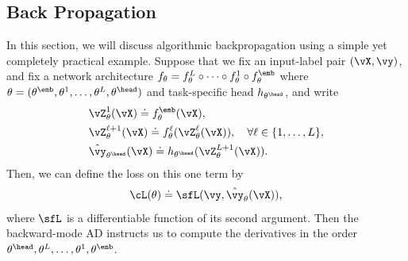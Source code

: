 \documentclass[../../book-main.tex]{subfiles}
\begin{document}
\subsection{Back Propagation}
\label{app:BP-section}
In this section, we will discuss algorithmic backpropagation using a
simple yet completely practical example. Suppose that we fix an
input-label pair \((\vX, \vy)\), and fix a network architecture
\(f_{\theta} = f_{\theta}^{L} \circ \cdots \circ f_{\theta}^{1} \circ
f_{\theta}^{\emb}\) where \(\theta = (\theta^{\emb}, \theta^{1},
\dots, \theta^{L}, \theta^{\head})\) and task-specific head
\(h_{\theta^{\head}}\), and write
\begin{align}
    &\vZ_{\theta}^{1}(\vX) \doteq f_{\theta}^{\emb}(\vX), \\
    &\vZ_{\theta}^{\ell + 1}(\vX) \doteq
    f_{\theta}^{\ell}(\vZ_{\theta}^{\ell}(\vX)), \quad \forall \ell
    \in \{1, \dots, L\}, \\
    &\hat{\vy}_{\theta^{\head}}(\vX) \doteq h_{\theta^{\head}}(\vZ_{\theta}^{L+1}(\vX)).
\end{align}
Then, we can define the loss on this one term by
\begin{equation}
    \cL(\theta) \doteq \sfL(\vy, \hat{\vy}_{\theta}(\vX)),
\end{equation}
where \(\sfL\) is a differentiable function of its second argument.
Then the backward-mode AD instructs us to compute the derivatives in
the order \(\theta^{\head}, \theta^{L}, \dots, \theta^{1}, \theta^{\emb}\).
\end{document}
